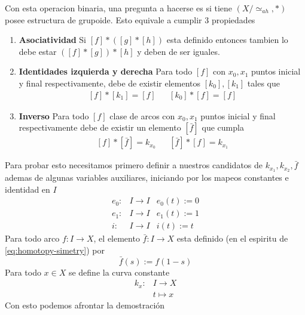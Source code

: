 \documentclass[letterpaper]{article}
\theoremstyle{definition}
\theoremstyle{plain}
\theoremstyle{plain}
\theoremstyle{remark}
\begin{document}
Con esta operacion binaria, una pregunta a hacerse es si tiene
\((X/\simeq_{ah} , *)\) posee
estructura de grupoide. Esto equivale a cumplir 3 propiedades
\begin{enumerate}
\item \textbf{Asociatividad} Si \([f] * ([g] * [h])\) esta definido entonces
  tambien lo debe estar \(([f] * [g]) * [h]\) y deben de ser iguales.
\item \textbf{Identidades izquierda y derecha} Para todo \([f]\) con
  \(x_0, x_1\) puntos inicial y final respectivamente, debe de
existir elementos \([k_{0}], [k_{1}]\) tales que
\[ \begin{matrix}
    [f] * [k_{1}] = [f] & & [k_{0}] * [f] = [f]
  \end{matrix}
\]
\item \textbf{Inverso} Para todo \([f]\) clase de arcos con \(x_0, x_1\)
  puntos inicial y final respectivamente debe de existir un elemento
  \([\bar{f}]\) que cumpla
\[ \begin{matrix}
    [f] * [\bar{f}] = k_{x_0} & & [\bar{f}] * [f] = k_{x_1}
  \end{matrix}
\]
\end{enumerate}
Para probar esto necesitamos primero definir a nuestros candidatos de
\(k_{x_1}, k_{x_2}, \bar{f}\) ademas de algunas variables auxiliares,
iniciando por los mapeos constantes e identidad en \(I\)
\[ \begin{matrix}
     e_0 : & I \to I & e_0(t) := 0 \\
     e_1 : & I \to I & e_1(t) := 1 \\
     i :   & I \to I & i(t) := t
   \end{matrix}
   \]
Para todo arco \(f : I \to X \), el elemento \(\bar{f} : I \to X \) esta
definido (en el espiritu de \eqref{eq:homotopy-simetry}) por
\[ \bar{f} (s) := f (1 - s) \]
Para todo \(x \in X \) se define la curva constante
\begin{align*}
  k_x : &I \to X \\
        &t \mapsto x
\end{align*}
Con esto podemos afrontar la demostración
\end{document}
